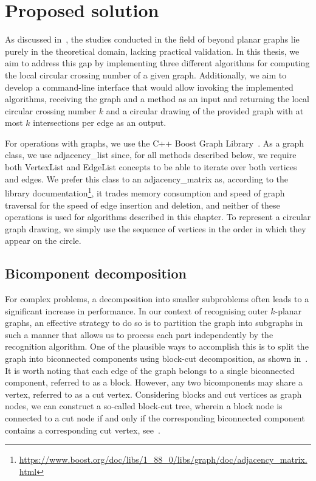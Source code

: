\chapter{Proposed solution}\label{ch:proposed-solution}

As discussed in~, the studies conducted in the field of beyond planar graphs lie purely in the theoretical domain, lacking practical validation. In this thesis, we aim to address this gap by implementing three different algorithms for computing the local circular crossing number of a given graph. Additionally, we aim to develop a command-line interface that would allow invoking the implemented algorithms, receiving the graph and a method as an input and returning the local circular crossing number \(k\) and a circular drawing of the provided graph with at most \(k\) intersections per edge as an output.

For operations with graphs, we use the C++ Boost Graph Library~\cite{boost}. As a graph class, we use \textsf{adjacency\_list} since, for all methods described below, we require both \textsf{VertexList} and \textsf{EdgeList} concepts to be able to iterate over both vertices and edges. We prefer this class to an \textsf{adjacency\_matrix} as, according to the library documentation\footnote{\url{https://www.boost.org/doc/libs/1_88_0/libs/graph/doc/adjacency_matrix.html}}, it trades memory consumption and speed of graph traversal for the speed of edge insertion and deletion, and neither of these operations is used for algorithms described in this chapter. To represent a circular graph drawing, we simply use the sequence of vertices in the order in which they appear on the circle.


\section{Bicomponent decomposition}

For complex problems, a decomposition into smaller subproblems often leads to a significant increase in performance. In our context of recognising outer \(k\)-planar graphs, an effective strategy to do so is to partition the graph into subgraphs in such a manner that allows us to process each part independently by the recognition algorithm. One of the plausible ways to accomplish this is to split the graph into biconnected components using block-cut decomposition, as shown in~. It is worth noting that each edge of the graph belongs to a single biconnected component, referred to as a block. However, any two bicomponents may share a vertex, referred to as a cut vertex. Considering blocks and cut vertices as graph nodes, we can construct a so-called block-cut tree, wherein a block node is connected to a cut node if and only if the corresponding biconnected component contains a corresponding cut vertex, see~.

